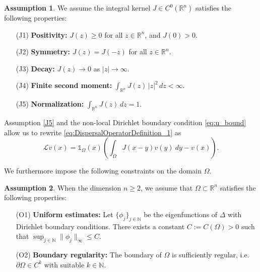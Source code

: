 \documentclass[preprint,12pt]{elsarticle}
\makeatletter
\theoremstyle{plain}
\theoremstyle{definition}
\newtheorem{asm}{Assumption}[section]
\theoremstyle{remark}
\newcommand{\mylabel}[2]{#2\def\@currentlabel{#2}\label{#1}}
\makeatother
\begin{document}
\begin{asm}
\label{assumptions_general_kernel}
We assume the integral kernel $J \in C^0(\mathbb{R}^n)$ satisfies the following properties:
\begin{enumerate}[label=\textnormal{(\arabic*)}, leftmargin=2em]
    \item[\mylabel{J1}{(J1)}] \textbf{Positivity:} 
    $J(z) \geq 0$ for all $z \in \mathbb{R}^n$, and $J(0) > 0$. 

    \item[\mylabel{J2}{(J2)}] \textbf{Symmetry:} 
    $J(z) = J(-z)$ for all $z \in \mathbb{R}^n$. 

    \item[\mylabel{J3}{(J3)}] \textbf{Decay:} 
    $J(z) \to 0$ as $|z| \to \infty$. 

    \item[\mylabel{J4}{(J4)}] \textbf{Finite second moment:} $\int_{\mathbb{R}^n} J(z)\,|z|^2 \,dz < \infty.$

    \item[\mylabel{J5}{(J5)}] \textbf{Normalization:} $\int_{\mathbb{R}^n} J(z)\,dz = 1.$
\end{enumerate}
\end{asm}

Assumption \ref{J5} and the non-local Dirichlet boundary condition \eqref{eq:u_bound} allow us to rewrite \eqref{eq:DispersalOperatorDefinition_1} as
\begin{equation}
    \label{EQ:DispersalOperatorDefinition_2}
    \mathcal{L} v(x) = \mathds{1}_{\Omega}(x) \left(\int_{\Omega} J(x-y) v(y)\:dy - v(x)\right).
\end{equation}

We furthermore impose the following constraints on the domain $\Omega$.

\begin{asm}
\label{assumptions_domain}
When the dimension $n \geq 2$, we assume that $\Omega \subset \mathbb{R}^n$ satisfies the following properties:
\begin{enumerate}[label=\textnormal{(\arabic*)}, leftmargin=2em]
    \item[\mylabel{O1}{(O1)}] \textbf{Uniform estimates:} 
    Let $\{\phi_j\}_{j \in \mathbb{N}}$ be the eigenfunctions of $\Delta$ with Dirichlet boundary conditions. There exists a constant $C := C(\Omega) > 0$ such that $\sup_{j \in \mathbb{N}}\|\phi_j\|_\infty \leq C$.

    \item[\mylabel{O2}{(O2)}] \textbf{Boundary regularity:} 
    The boundary of $\Omega$ is sufficiently regular, i.e.\ $\partial\Omega \in C^k$ with suitable $k \in \mathbb{N}$.
\end{enumerate}
\end{asm}
\end{document}
